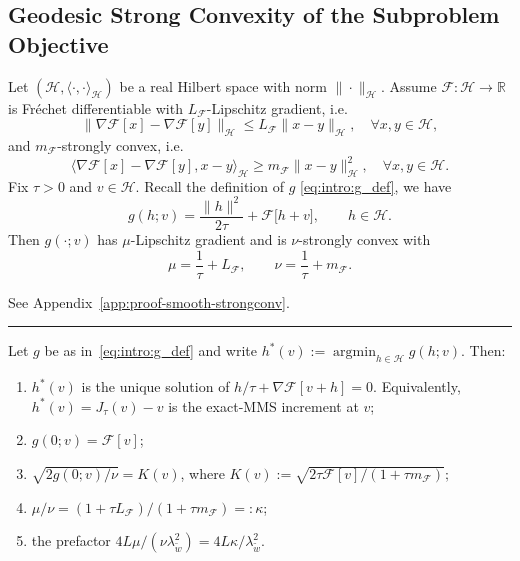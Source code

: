 \documentclass[twoside,11pt]{article}
\newcommand{\BlackBoxProof}{\rule{1.5ex}{1.5ex}}
\renewenvironment{proof}{\par\noindent{\bf Proof\ }}{\hfill\BlackBoxProof\par\medskip}
\newcommand{\argmin}{\mathop{\mathrm{arg min}}}
\newcommand{\calF}{\mathcal{F}}
\newcommand{\calH}{\mathcal{H}}
\begin{document}
\subsection{Geodesic Strong Convexity of the Subproblem Objective}
\begin{lemma}\label{lem:smooth-strongconv}
Let $(\mathcal H,\langle\cdot,\cdot\rangle_\mathcal{H})$ be a real Hilbert space with norm $\|\cdot\|_{\mathcal{H}}$. 
Assume $\mathcal F:\mathcal H\to\mathbb R$ is Fr\'echet differentiable with $L_{\mathcal F}$-Lipschitz gradient, i.e.
\[
\|\nabla \mathcal F[x]-\nabla \mathcal F[y]\|_\mathcal{H}\le L_{\mathcal F} \|x-y\|_\mathcal{H},\quad\forall x,y\in\mathcal H,
\]
and $m_\mathcal{F}$-strongly convex, i.e.
\[
\langle \nabla \mathcal F[x]-\nabla \mathcal F[y], x-y\rangle_\mathcal{H} \ge m_\mathcal{F} \|x-y\|_\mathcal{H}^2,\quad\forall x,y\in\mathcal H.
\]
Fix $\tau>0$ and $v\in\mathcal H$. Recall the definition of $g$ \eqref{eq:intro:g_def}, we have
\[
g(h;v)=\frac{\|h\|^2}{2\tau}+\mathcal F\!\bigl[h+v\bigr],\qquad h\in\mathcal H.
\]
Then $g(\cdot;v)$ has $\mu$-Lipschitz gradient and is $\nu$-strongly convex with
\[
\mu=\frac{1}{\tau}+L_{\mathcal F},
\qquad
\nu=\frac{1}{\tau}+m_\mathcal{F}.
\]


\end{lemma}

\begin{proof}
See Appendix~\ref{app:proof-smooth-strongconv}.
\end{proof}

\begin{lemma}\label{lem:g-properties}
Let $g$ be as in~\eqref{eq:intro:g_def} and write $h^*(v):=\argmin_{h\in\calH}g(h;v)$. Then:
\begin{enumerate}[label=(\alph*),leftmargin=*,nosep]
\item $h^*(v)$ is the unique solution of $h/\tau+\nabla\calF[v+h]=0$. Equivalently, $h^*(v)=J_\tau(v)-v$ is the exact-MMS increment at $v$;
\item $g(0;v)=\calF[v]$;
\item $\sqrt{2g(0;v)/\nu}=K(v)$, where
\(
K(v):=\sqrt{2\tau\calF[v]/(1+\tau m_\calF)};
\)
\item $\mu/\nu=(1+\tau L_\calF)/(1+\tau m_\calF)=:\kappa$;
\item the prefactor $4L\mu/(\nu\lambda_{\tilde w}^{2})=4L\kappa/\lambda_{\tilde w}^{2}$.
\end{enumerate}
\end{lemma}
\end{document}
